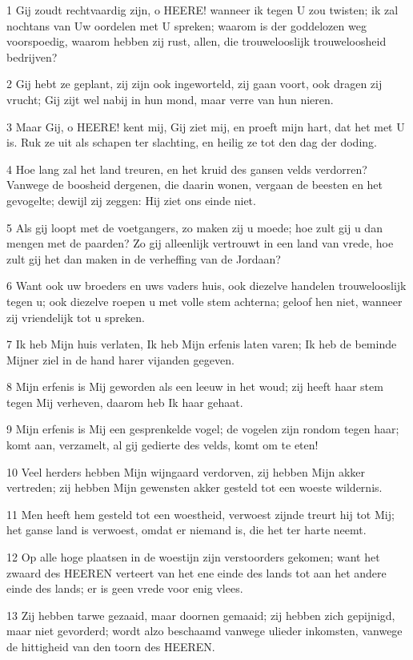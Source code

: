 \par 1 Gij zoudt rechtvaardig zijn, o HEERE! wanneer ik tegen U zou twisten; ik zal nochtans van Uw oordelen met U spreken; waarom is der goddelozen weg voorspoedig, waarom hebben zij rust, allen, die trouwelooslijk trouweloosheid bedrijven?
\par 2 Gij hebt ze geplant, zij zijn ook ingeworteld, zij gaan voort, ook dragen zij vrucht; Gij zijt wel nabij in hun mond, maar verre van hun nieren.
\par 3 Maar Gij, o HEERE! kent mij, Gij ziet mij, en proeft mijn hart, dat het met U is. Ruk ze uit als schapen ter slachting, en heilig ze tot den dag der doding.
\par 4 Hoe lang zal het land treuren, en het kruid des gansen velds verdorren? Vanwege de boosheid dergenen, die daarin wonen, vergaan de beesten en het gevogelte; dewijl zij zeggen: Hij ziet ons einde niet.
\par 5 Als gij loopt met de voetgangers, zo maken zij u moede; hoe zult gij u dan mengen met de paarden? Zo gij alleenlijk vertrouwt in een land van vrede, hoe zult gij het dan maken in de verheffing van de Jordaan?
\par 6 Want ook uw broeders en uws vaders huis, ook diezelve handelen trouwelooslijk tegen u; ook diezelve roepen u met volle stem achterna; geloof hen niet, wanneer zij vriendelijk tot u spreken.
\par 7 Ik heb Mijn huis verlaten, Ik heb Mijn erfenis laten varen; Ik heb de beminde Mijner ziel in de hand harer vijanden gegeven.
\par 8 Mijn erfenis is Mij geworden als een leeuw in het woud; zij heeft haar stem tegen Mij verheven, daarom heb Ik haar gehaat.
\par 9 Mijn erfenis is Mij een gesprenkelde vogel; de vogelen zijn rondom tegen haar; komt aan, verzamelt, al gij gedierte des velds, komt om te eten!
\par 10 Veel herders hebben Mijn wijngaard verdorven, zij hebben Mijn akker vertreden; zij hebben Mijn gewensten akker gesteld tot een woeste wildernis.
\par 11 Men heeft hem gesteld tot een woestheid, verwoest zijnde treurt hij tot Mij; het ganse land is verwoest, omdat er niemand is, die het ter harte neemt.
\par 12 Op alle hoge plaatsen in de woestijn zijn verstoorders gekomen; want het zwaard des HEEREN verteert van het ene einde des lands tot aan het andere einde des lands; er is geen vrede voor enig vlees.
\par 13 Zij hebben tarwe gezaaid, maar doornen gemaaid; zij hebben zich gepijnigd, maar niet gevorderd; wordt alzo beschaamd vanwege ulieder inkomsten, vanwege de hittigheid van den toorn des HEEREN.
